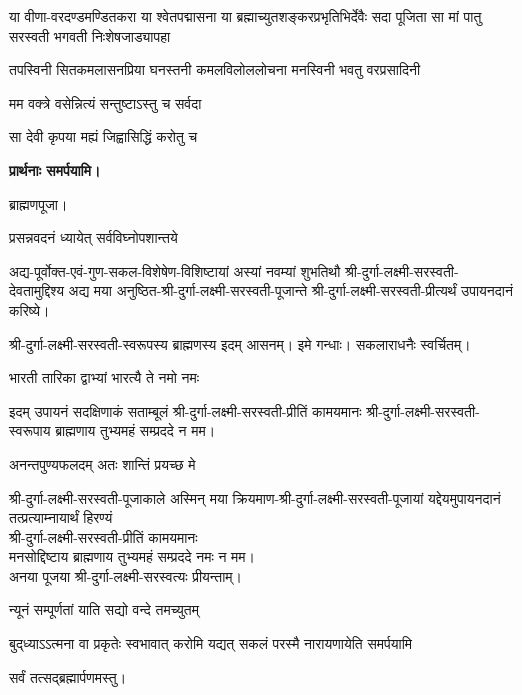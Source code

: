 \begin{center}

{या वीणा-वरदण्डमण्डितकरा या श्वेतपद्मासना}
{या ब्रह्माच्युतशङ्करप्रभृतिभिर्देवैः सदा पूजिता}
{सा मां पातु सरस्वती भगवती निःशेषजाड्यापहा}

{तपस्विनी सितकमलासनप्रिया}
{घनस्तनी कमलविलोललोचना}
{मनस्विनी भवतु वरप्रसादिनी}

{मम वक्त्रे वसेन्नित्यं सन्तुष्टाऽस्तु च सर्वदा}

{सा देवी कृपया मह्यं जिह्वासिद्धिं करोतु च}

\textbf{प्रार्थनाः समर्पयामि।}

ब्राह्मणपूजा।

{प्रसन्नवदनं ध्यायेत् सर्वविघ्नोपशान्तये}

अद्य-पूर्वोक्त-एवं-गुण-सकल-विशेषेण-विशिष्टायां अस्यां नवम्यां शुभतिथौ श्री-दुर्गा-लक्ष्मी-सरस्वती-देवतामुद्दिश्य अद्य मया अनुष्ठित-श्री-दुर्गा-लक्ष्मी-सरस्वती-पूजान्ते  
श्री-दुर्गा-लक्ष्मी-सरस्वती-प्रीत्यर्थं उपायनदानं करिष्ये।

श्री-दुर्गा-लक्ष्मी-सरस्वती-स्वरूपस्य ब्राह्मणस्य इदम् आसनम्। इमे गन्धाः। सकलाराधनैः स्वर्चितम्।

{भारती तारिका द्वाभ्यां भारत्यै ते नमो नमः}

इदम् उपायनं सदक्षिणाकं सताम्बूलं श्री-दुर्गा-लक्ष्मी-सरस्वती-प्रीतिं कामयमानः श्री-दुर्गा-लक्ष्मी-सरस्वती-स्वरूपाय ब्राह्मणाय तुभ्यमहं सम्प्रददे न मम।

{अनन्तपुण्यफलदम् अतः शान्तिं प्रयच्छ मे}

श्री-दुर्गा-लक्ष्मी-सरस्वती-पूजाकाले अस्मिन् मया क्रियमाण-श्री-दुर्गा-लक्ष्मी-सरस्वती-पूजायां यद्देयमुपायनदानं तत्प्रत्याम्नायार्थं हिरण्यं\\
श्री-दुर्गा-लक्ष्मी-सरस्वती-प्रीतिं कामयमानः\\
मनसोद्दिष्टाय ब्राह्मणाय तुभ्यमहं सम्प्रददे नमः न मम।\\ 
अनया पूजया श्री-दुर्गा-लक्ष्मी-सरस्वत्यः प्रीयन्ताम्। 
\end{center}


{न्यूनं सम्पूर्णतां याति सद्यो वन्दे तमच्युतम्}

{बुद्‌ध्याऽऽत्मना वा प्रकृतेः स्वभावात्}
{करोमि यद्यत् सकलं परस्मै}
{नारायणायेति समर्पयामि}

\centerline{सर्वं तत्सद्ब्रह्मार्पणमस्तु।}

\closesub

 

\closesection